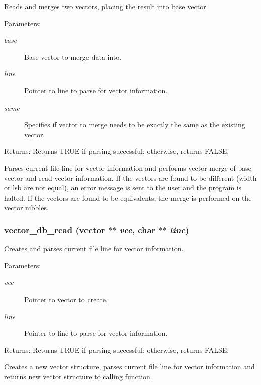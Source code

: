 Reads and merges two vectors, placing the result into base vector. 

\begin{Desc}
\item[Parameters:]
\begin{description}
\item[{\em base}]Base vector to merge data into. \item[{\em line}]Pointer to line to parse for vector information. \item[{\em same}]Specifies if vector to merge needs to be exactly the same as the existing vector.\end{description}
\end{Desc}
\begin{Desc}
\item[Returns:]Returns TRUE if parsing successful; otherwise, returns FALSE.\end{Desc}
Parses current file line for vector information and performs vector merge of base vector and read vector information. If the vectors are found to be different (width or lsb are not equal), an error message is sent to the user and the program is halted. If the vectors are found to be equivalents, the merge is performed on the vector nibbles. 
\subsubsection{ vector\_\-db\_\-read ({\bf vector} $\ast$$\ast$ {\em vec}, char $\ast$$\ast$ {\em line})}\label{vector_8c_a12}


Creates and parses current file line for vector information. 

\begin{Desc}
\item[Parameters:]
\begin{description}
\item[{\em vec}]Pointer to vector to create. \item[{\em line}]Pointer to line to parse for vector information.\end{description}
\end{Desc}
\begin{Desc}
\item[Returns:]Returns TRUE if parsing successful; otherwise, returns FALSE.\end{Desc}
Creates a new vector structure, parses current file line for vector information and returns new vector structure to calling function. 
